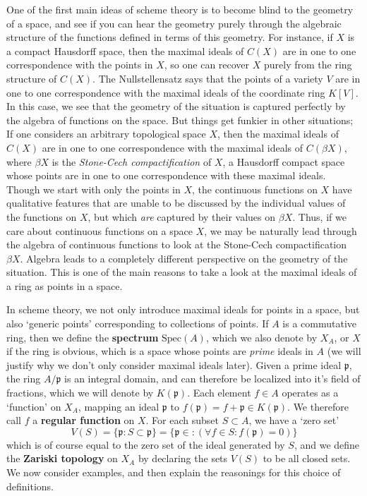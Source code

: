 One of the first main ideas of scheme theory is to become blind to the geometry of a space, and see if you can hear the geometry purely through the algebraic structure of the functions defined in terms of this geometry. For instance, if $X$ is a compact Hausdorff space, then the maximal ideals of $C(X)$ are in one to one correspondence with the points in $X$, so one can recover $X$ purely from the ring structure of $C(X)$. The Nullstellensatz says that the points of a variety $V$ are in one to one correspondence with the maximal ideals of the coordinate ring $K[V]$. In this case, we see that the geometry of the situation is captured perfectly by the algebra of functions on the space. But things get funkier in other situations; If one considers an arbitrary topological space $X$, then the maximal ideals of $C(X)$ are in one to one correspondence with the maximal ideals of $C(\beta X)$, where $\beta X$ is the {\it Stone-Cech compactification} of $X$, a Hausdorff compact space whose points are in one to one correspondence with these maximal ideals. Though we start with only the points in $X$, the continuous functions on $X$ have qualitative features that are unable to be discussed by the individual values of the functions on $X$, but which {\it are} captured by their values on $\beta X$. Thus, if we care about continuous functions on a space $X$, we may be naturally lead through the algebra of continuous functions to look at the Stone-Cech compactification $\beta X$. Algebra leads to a completely different perspective on the geometry of the situation. This is one of the main reasons to take a look at the maximal ideals of a ring as points in a space.

In scheme theory, we not only introduce maximal ideals for points in a space, but also `generic points' corresponding to collections of points. If $A$ is a commutative ring, then we define the {\bf spectrum} $\text{Spec}(A)$, which we also denote by $X_A$, or $X$ if the ring is obvious, which is a space whose points are {\it prime} ideals in $A$ (we will justify why we don't only consider maximal ideals later). Given a prime ideal $\mathfrak{p}$, the ring $A/\mathfrak{p}$ is an integral domain, and can therefore be localized into it's field of fractions, which we will denote by $K(\mathfrak{p})$. Each element $f \in A$ operates as a `function' on $X_A$, mapping an ideal $\mathfrak{p}$ to $f(\mathfrak{p}) = f + \mathfrak{p} \in K(\mathfrak{p})$. We therefore call $f$ a {\bf regular function} on $X$. For each subset $S \subset A$, we have a `zero set'
%
\[ V(S) = \{ \mathfrak{p}: S \subset \mathfrak{p} \} = \{ \mathfrak{p} \in : (\forall f \in S: f(\mathfrak{p}) = 0) \} \]
%
which is of course equal to the zero set of the ideal generated by $S$, and we define the {\bf Zariski topology} on $X_A$ by declaring the sets $V(S)$ to be all closed sets. We now consider examples, and then explain the reasonings for this choice of definitions.

